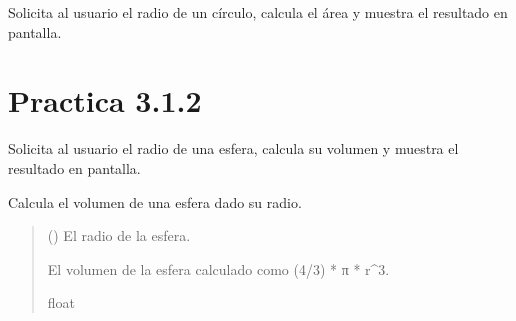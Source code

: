 \documentclass[letterpaper,10pt,spanish]{sphinxmanual}
\begin{document}

\begin{fulllineitems}
\label{\detokenize{pr3:pr3.1_1.main}}
\pysigstartsignatures
{}
\pysigstopsignatures
\sphinxAtStartPar
Solicita al usuario el radio de un círculo, calcula el área
y muestra el resultado en pantalla.

\end{fulllineitems}



\section{Practica 3.1.2}
\label{\detokenize{pr3:module-pr3.1_2}}\label{\detokenize{pr3:practica-3-1-2}}

\begin{fulllineitems}
\label{\detokenize{pr3:pr3.1_2.main}}
\pysigstartsignatures
{}
\pysigstopsignatures
\sphinxAtStartPar
Solicita al usuario el radio de una esfera, calcula su volumen
y muestra el resultado en pantalla.

\end{fulllineitems}


\begin{fulllineitems}
\label{\detokenize{pr3:pr3.1_2.volumen_esfera}}
\pysigstartsignatures
{}
\pysigstopsignatures
\sphinxAtStartPar
Calcula el volumen de una esfera dado su radio.
\begin{quote}\begin{description}
\sphinxAtStartPar
{} () \textendash{} El radio de la esfera.

\sphinxAtStartPar
El volumen de la esfera calculado como (4/3) * π * r\textasciicircum{}3.

\sphinxAtStartPar
float

\end{description}\end{quote}

\end{fulllineitems}
\end{document}
